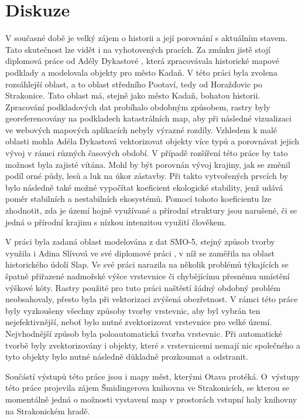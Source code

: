 \documentclass[thesis=M,czech]{FITthesis}[2012/06/26]
\begin{document}
\chapter{Diskuze}
V současné době je velký zájem o historii a její porovnání s aktuálním stavem. Tato skutečnost lze vidět i na vyhotovených pracích. Za zmínku jistě stojí diplomová práce od Adély Dykastové  \cite{dykastova}, která zpracovávala historické mapové podklady a modelovala objekty pro město Kadaň. V této práci byla zvolena rozsáhlejší oblast, a to oblast středního Pootaví, tedy od Horažďovic po Strakonice. Tato oblast má, stejně jako město Kadaň, bohatou historii. Zpracování podkladových dat probíhalo obdobným způsobem, rastry byly georeferencovány na podkladech katastrálních map, aby při následné vizualizaci ve webových mapových aplikacích nebyly výrazné rozdíly. Vzhledem k malé oblasti mohla Adéla Dykastová vektorizovat objekty více typů a porovnávat jejich vývoj v rámci různých časových období. V případě rozšíření této práce by tato možnost byla zajisté vítána. Mohl by být porovnán vývoj krajiny, jak se změnil podíl orné půdy, lesů a luk na úkor zástavby. Při takto vytvořených prvcích by bylo následně také možné vypočítat koeficient ekologické stability, jenž udává poměr stabilních a nestabilních ekosystémů. Pomocí tohoto koeficientu lze zhodnotit, zda je území hojně využívané a přírodní struktury jsou narušené, či se jedná o přírodní krajinu s nízkou intenzitou využití člověkem. 

V práci byla zadaná oblast modelována z dat SMO-5, stejný způsob tvorby využila i Adina Slívová ve své diplomové práci \cite{adina}, v níž se zaměřila na oblast historického údolí Slap. Ve své práci narazila na několik problémů týkajících se špatně přiřazené nadmořské výšce vrstevnice či chybějícímu přesnému umístění výškové kóty. Rastry použité pro tuto práci naštěstí žádný obdobný problém neobsahovaly, přesto byla při vektorizaci zvýšená obezřetnost. V rámci této práce byly vyzkoušeny všechny způsoby tvorby vrstevnic, aby byl vybrán ten nejefektivnější, neboť bylo nutné zvektorizovat vrstevnice pro velké území. Nejvhodnější způsob byla poloautomatická tvorba vrstevnic. Při automatické tvorbě byly zvektorizovány i objekty, které s vrstevnicemi nemají nic společného a tyto objekty bylo nutné následně důkladně prozkoumat a odstranit. 

Součástí výstupů této práce jsou i mapy měst, kterými Otava protéká.  O~výstupy této práce projevila zájem Šmidingerova knihovna ve Strakonicích, se kterou se momentálně jedná o možnosti vystavení map v prostorách vstupní haly knihovny na Strakonickém hradě. 
\end{document}
